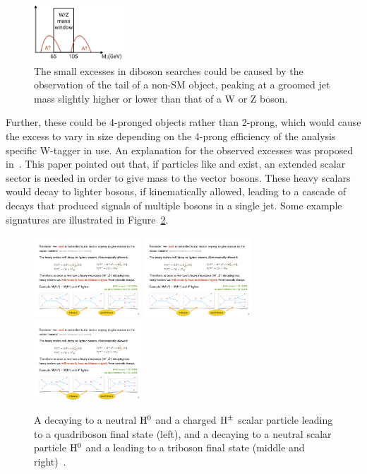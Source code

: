 \begin{figure}[h!] 
    \centering
    \includegraphics[width=0.3\textwidth]{figures/analysis/search3/misc/tails.png}
    \caption{The small excesses in diboson searches could be caused by the observation of the tail of a non-SM object, peaking at a groomed jet mass slightly higher or lower than that of a W or Z boson.}
    \label{fig:searchIII:tails}
\end{figure}
Further, these could be 4-pronged objects rather than 2-prong, which would cause the excess to vary in size depending on the 4-prong efficiency of the analysis specific W-tagger in use. An explanation for the observed excesses was proposed in~\cite{Aguilar-Saavedra:2018xpl}. This paper pointed out that, if particles like \PWpr and \PZpr exist, an extended scalar sector is needed in order to give mass to the
vector bosons. These heavy scalars would decay to lighter bosons, if kinematically allowed, leading to a cascade of decays that produced signals of multiple bosons in a single jet. Some example signatures are illustrated in Figure~\ref{fig:searchIII:tribosons}.
\begin{figure}[h!] 
    \centering
    \includegraphics[height=3cm]{figures/analysis/search3/misc/quadri.pdf}
    \includegraphics[height=3cm]{figures/analysis/search3/misc/tri1.pdf}
    \includegraphics[height=3cm]{figures/analysis/search3/misc/tri2.pdf}
    \caption{A \PWpr decaying to a neutral $\rm{H}^0$ and a charged $\rm{H}^{\pm}$ scalar particle leading to a quadriboson final state (left), and a \PWpr decaying to a neutral scalar particle $\rm{H}^0$ and a \PW leading to a triboson final state (middle and right)~\cite{Aguilar-Saavedra:2018xpl}.}
    \label{fig:searchIII:tribosons}
\end{figure}
